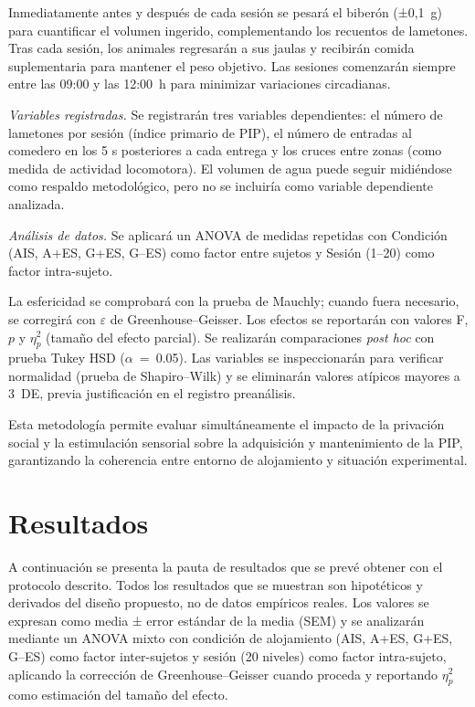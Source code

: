 \documentclass[12pt,a4paper]{article}
\begin{document}
\begin{multicols}{2}
Inmediatamente antes y después de cada sesión se pesará el biberón (±0,1~g) para cuantificar el volumen ingerido, complementando los recuentos de lametones. Tras cada sesión, los animales regresarán a sus jaulas y recibirán comida suplementaria para mantener el peso objetivo. Las sesiones comenzarán siempre entre las 09:00 y las 12:00~h para minimizar variaciones circadianas.

\textit{Variables registradas.} Se registrarán tres variables dependientes: el número de lametones por sesión (índice primario de PIP), el número de entradas al comedero en los 5 s posteriores a cada entrega y los cruces entre zonas (como medida de actividad locomotora). El volumen de agua puede seguir midiéndose como respaldo metodológico, pero no se incluiría como variable dependiente analizada.


\textit{Análisis de datos.} Se aplicará un ANOVA de medidas repetidas con Condición (AIS, A+ES, G+ES, G--ES) como factor entre sujetos y Sesión (1–20) como factor intra-sujeto.

La esfericidad se comprobará con la prueba de Mauchly; cuando fuera necesario, se corregirá con $\varepsilon$ de Greenhouse–Geisser. Los efectos se reportarán con valores F, $p$ y $\eta^2_p$ (tamaño del efecto parcial). Se realizarán comparaciones \textit{post hoc} con prueba Tukey HSD ($\alpha$~=~0.05). Las variables se inspeccionarán para verificar normalidad (prueba de Shapiro--Wilk) y se eliminarán valores atípicos mayores a $3$~DE, previa justificación en el registro preanálisis.


\vspace{2mm}
Esta metodología permite evaluar simultáneamente el impacto de la privación social y la estimulación sensorial sobre la adquisición y mantenimiento de la PIP, garantizando la coherencia entre entorno de alojamiento y situación experimental.



\section{Resultados}

A continuación se presenta la pauta de resultados que se prevé obtener con el protocolo descrito. Todos los resultados que se muestran son hipotéticos y derivados del diseño propuesto, no de datos empíricos reales. Los valores se expresan como media ± error estándar de la media (SEM) y se analizarán mediante un ANOVA mixto con condición de alojamiento (AIS, A+ES, G+ES, G--ES) como factor inter-sujetos y sesión (20 niveles) como factor intra-sujeto, aplicando la corrección de Greenhouse–Geisser cuando proceda y reportando $\eta^2_p$ como estimación del tamaño del efecto.


\end{multicols}
\end{document}
